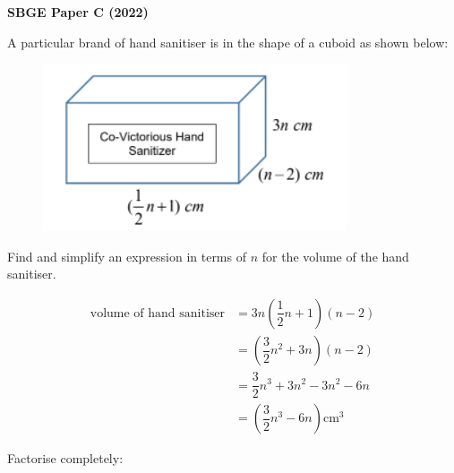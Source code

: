 \documentclass[11pt, answers, addpoints]{exam}
\renewcommand{\frac}[2]{\dfrac{#1}{#2}}
\begin{document}
\onehalfspacing%

\begin{center}
	\Large
	\textbf{SBGE Paper C (2022)}
\end{center}

\bracketedpoints%
\pointsinrightmargin%

\begin{questions}
	\question[2] A particular brand of hand sanitiser is in the shape
	of a cuboid as shown below:
	\begin{figure}[htpb]
		\centering
		\includegraphics[scale=0.7]{./q1.png}
		\label{fig:sanitiser}
	\end{figure}

	Find and simplify an expression in terms of \(n\) for the volume of the
	hand sanitiser.

	\begin{solution}
		\begin{align*}
			\text{volume of hand sanitiser} & = 3n\left(\frac{1}{2}n + 1\right)(n - 2)                     \\
			                                & = \left(\frac{3}{2}n^{2} + 3n\right)(n - 2)                  \\
			                                & = \frac{3}{2}n^{3} + 3n^{2} - 3n^{2} - 6n                    \\
			                                & = \left(\frac{3}{2}n^{3} - 6n\right) \si{\centi\metre\cubed}
		\end{align*}
	\end{solution}


	\question Factorise completely:
\end{questions}
\end{document}
